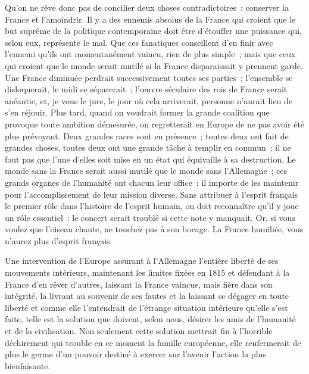 \documentclass[french,twoside]{book} %
\begin{document}
Qu’on ne rêve donc pas de concilier deux choses contradictoires : conserver la France et l’amoindrir. Il y a des ennemis absolus de la France qui croient que le but suprême de la politique contemporaine doit être d’étouffer une puissance qui, selon eux, représente le mal. Que ces fanatiques conseillent d’en finir avec l’ennemi qu’ils ont momentanément vaincu, rien de plus simple ; mais que ceux qui croient que le monde serait mutilé si la France disparaissait y prennent garde. Une France diminuée perdrait successivement toutes ses parties ; l’ensemble se disloquerait, le midi se séparerait ; l’œuvre séculaire des rois de France serait anéantie, et, je vous le jure, le jour où cela arriverait, personne n’aurait lieu de s’en réjouir. Plus tard, quand on voudrait former la grande coalition que provoque toute ambition démesurée, on regretterait en Europe de ne pas avoir été plus prévoyant. Deux grandes races sont en présence ; toutes deux ont fait de grandes choses, toutes deux ont une grande tâche à remplir en commun ; il ne faut pas que l’une d’elles soit mise en un état qui équivaille à sa destruction. Le monde sans la France serait aussi mutilé que le monde sans l’Allemagne ; ces grands organes de l’humanité ont chacun leur office : il importe de les maintenir pour l’accomplissement de leur mission diverse. Sans attribuer à l’esprit français le premier rôle dans l’histoire de l’esprit humain, on doit reconnaître qu’il y joue un rôle essentiel : le concert serait troublé si cette note y manquait. Or, si vous voulez que l’oiseau chante, ne touchez pas à son bocage. La France humiliée, vous n’aurez plus d’esprit français.\par
Une intervention de l’Europe assurant à l’Allemagne l’entière liberté de ses mouvements intérieurs, maintenant les limites fixées en 1815 et défendant à la France d’en rêver d’autres, laissant la France vaincue, mais fière dans son intégrité, la livrant au souvenir de ses fautes et la laissant se dégager en toute liberté et comme elle l’entendrait de l’étrange situation intérieure qu’elle s’est faite, telle est la solution que doivent, selon nous, désirer les amis de l’humanité et de la civilisation. Non seulement cette solution mettrait fin à l’horrible déchirement qui trouble en ce moment la famille européenne, elle renfermerait de plus le germe d’un pouvoir destiné à exercer sur l’avenir l’action la plus bienfaisante.\par
\end{document}
